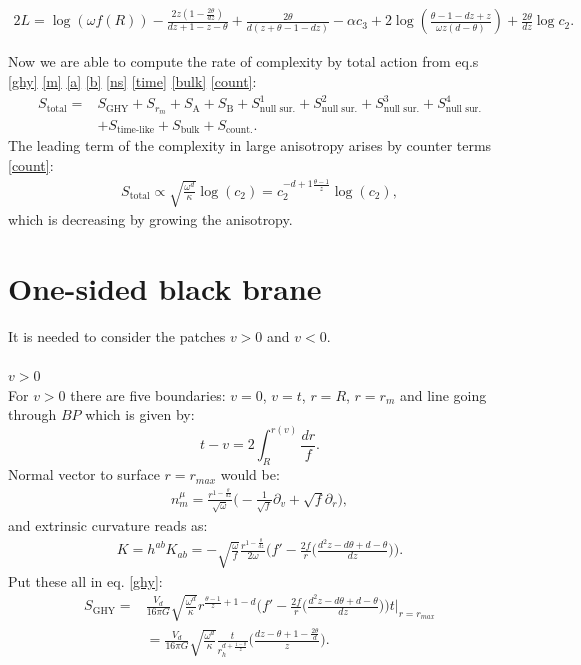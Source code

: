 \documentclass[]{article}
\begin{document}
\begin{align}
2L=\log(\omega f(R)) -\frac{2z(1-\frac{2\theta}{dz})}{dz+1-z-\theta}+\frac{2\theta}{d(z+\theta-1-dz)}-\alpha c_3+2\log(\frac{\theta-1-dz+z}{\omega z(d-\theta)})+\frac{2\theta}{dz}\log c_2.
\end{align}

Now we are able to compute the rate of complexity by total action from eq.s \eqref{ghy} \eqref{m} \eqref{a} \eqref{b} \eqref{ns} \eqref{time} \eqref{bulk} \eqref{count}:
\begin{equation}
\begin{aligned}
S_{\text{total}}=&S_{\text{GHY}}+S_{\text{$r_m$}}+S_{\text{A}}+S_{\text{B}}+S_{\text{null sur.}}^1+S_{\text{null sur.}}^2+S_{\text{null sur.}}^3+S_{\text{null sur.}}^4\\
&+S_{\text{time-like}}+S_{\text{bulk}}+S_{\text{count.}}.
\end{aligned}
\end{equation}
The leading term of the complexity in large anisotropy arises by counter terms \eqref{count}:
\begin{align} 
S_{\text{total}}\propto \sqrt{\frac{\omega^d}{\kappa}} \log(c_2)=c_2^{-d+1\frac{\theta-1}{z}}\log(c_2),
\end{align}\label{complexity}
which is decreasing by growing the anisotropy.
\section{One-sided black brane}\label{vaidyaa}
It is needed to consider the patches $v>0$ and $v<0$.
\\
\\
\textbf{\large $v>0$}
\\

For $v>0$ there are five boundaries: $v=0$, $v=t$, $r=R$, $r=r_m$ and line going through $BP$ which is given by:
\begin{equation}
t-v=2\int _R ^{r(v)} \frac{dr}{f}.
\end{equation}
Normal vector to surface $r=r_{max}$ would be:
\begin{align}
n_m^{\mu}=\frac{r^{1-\frac{\theta}{dz}}}{\sqrt{\omega}}\Big(-\frac{1}{\sqrt{f}}\partial_v+\sqrt{f}\partial_r\Big),
\end{align}
and extrinsic curvature reads as:
\begin{align}
K=h^{ab}K_{ab}=-\sqrt{\frac{\omega}{f}}\frac{ r^{1-\frac{\theta}{dz}}}{2\omega}\bigg(f'-\frac{2f}{r}\Big(\frac{d^2z-d\theta +d-\theta}{dz}\Big)\bigg).
\end{align}
Put these all in eq. \eqref{ghy}:
\begin{equation}
\begin{aligned}
S_{\text{GHY}}=&\frac{V_d}{16\pi G}\sqrt{\frac{\omega^d}{\kappa}} r^{\frac{\theta-1}{z}+1-d}\bigg(f'-\frac{2f}{r}\Big(\frac{d^2z-d\theta+d-\theta}{dz}\Big)\bigg)t\Big|_{r=r_{max}}\\
&=\frac{V_d}{16\pi G}\sqrt{\frac{\omega^d}{\kappa}} \frac{t}{r_h^{d+\frac{1-\theta}{z}}}\Big(\frac{dz-\theta+1-\frac{2\theta}{d}}{z}\Big).
\end{aligned}
\end{equation}
\end{document}
